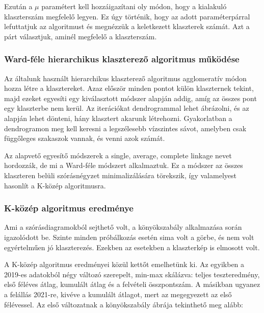 \documentclass[12pt]{article}
\begin{document}
Ezután a $\mu$ paramétert kell hozzáigazítani oly módon, hogy a kialakuló klaszterszám megfelelő legyen. Ez úgy történik, hogy az adott paraméterpárral lefuttatjuk az algoritmust és megnézzük a keletkezett klaszterek számát. Azt a párt választjuk, aminél megfelelő a klaszterszám.

\subsubsection{Ward-féle hierarchikus klaszterező algoritmus működése}

Az általunk használt hierarchikus klaszterező algoritmus agglomeratív módon hozza létre a klasztereket. Azaz először minden pontot külön klaszternek tekint, majd ezeket egyesíti egy kiválasztott módszer alapján addig, amíg az összes pont egy klaszterbe nem kerül. Az iterációkat dendrogrammal lehet ábrázolni, és az alapján lehet dönteni, hány klasztert akarunk létrehozni. Gyakorlatban a dendrogramon meg kell keresni a legszélesebb vízszintes sávot, amelyben csak függőleges szakaszok vannak, és venni azok számát.

Az alapvető egyesítő módszerek a single, average, complete linkage nevet hordozzák, de mi a Ward-féle módszert alkalmaztuk. Ez a módszer az összes klaszteren belüli szórásnégyzet minimalizálására törekszik, így valamelyest hasonlít a K-közép algoritmusra.

\subsubsection{K-közép algoritmus eredménye}
Ami a szórásdiagramokból sejthető volt, a könyökszabály alkalmazása során igazolódott be. Szinte minden próbálkozás esetén sima volt a görbe, és nem volt egyértelműen jó klaszterezés. Ezekben az esetekben a klaszterkép is elmosott volt.

A K-közép algoritmus eredményei közül kettőt emelhetünk ki. Az egyikben a 2019-es adatokból négy változó szerepelt, min-max skálázva: teljes teszteredmény, első féléves átlag, kumulált átlag és a felvételi összpontszám. A másikban ugyanez a felállás 2021-re, kivéve a kumulált átlagot, mert az megegyezett az első félévessel. Az első változatnak a könyökszabály ábrája tekinthető meg alább:
\end{document}
